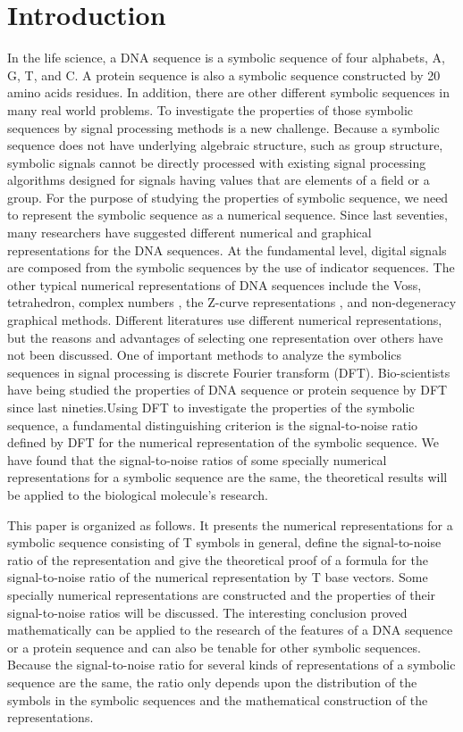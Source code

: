 \documentclass[preprint,authoryear,12pt]{elsarticle}
\begin{document}
\section{Introduction}
\label{Introduction}
In the life science, a DNA sequence is a symbolic sequence of four alphabets, A, G, T, and C. A protein sequence is also a symbolic sequence constructed by 20 amino acids residues. In addition, there are other different symbolic sequences in many real world problems. To investigate the properties of those symbolic sequences by signal processing methods is a new challenge. Because a symbolic sequence does not have underlying algebraic structure, such as group structure,  symbolic signals cannot be directly processed with existing signal processing algorithms designed for signals having values that are elements of a field or a group\citep{wang2002computing}. For the purpose of studying the properties of symbolic sequence, we need to represent the symbolic sequence as a numerical sequence. Since last seventies, many researchers have suggested different numerical and graphical representations for the DNA sequences\citep{A2001}. At the fundamental level, digital signals are composed from the symbolic sequences by the use of indicator sequences. The other typical numerical representations of DNA sequences include the Voss\citep{VOSS1993}, tetrahedron\citep{SILVERMAN1986}, complex numbers \citep{A2001}, the Z-curve representations \citep{ZHANG1994,ZHANG1998}, and non-degeneracy graphical methods\citep{YAU2003, WANG2006}. Different literatures use different numerical representations, but the reasons and advantages of selecting one representation over others have not been discussed. One of important methods to analyze the symbolics sequences in signal processing is discrete Fourier transform (DFT). Bio-scientists have being studied the properties of DNA sequence or protein sequence by DFT since last nineties\citep{Tiwari1997,A2001,Dodin2000,Kotlar2003,YIN2007}.Using DFT to investigate the properties of  the symbolic sequence, a fundamental distinguishing criterion is the signal-to-noise ratio defined by DFT for the numerical representation of the symbolic sequence. We have found that the signal-to-noise ratios of some specially numerical representations for a symbolic sequence are the same, the theoretical results will be applied to the biological molecule's research.

This paper is organized as follows. It presents the numerical representations for a symbolic sequence consisting of T symbols in general, define the signal-to-noise ratio of the representation and give the theoretical proof of a formula for the signal-to-noise ratio of the numerical representation by T base vectors. Some specially numerical representations are constructed and the properties of their signal-to-noise ratios will be discussed. The interesting conclusion proved mathematically can be applied to the research of the features of a DNA sequence or a protein sequence and can also be tenable for other symbolic sequences. Because the signal-to-noise ratio for several kinds of representations of a symbolic sequence are the same, the ratio only depends upon the distribution of the symbols in the symbolic sequences and the mathematical construction of the representations.
\end{document}
